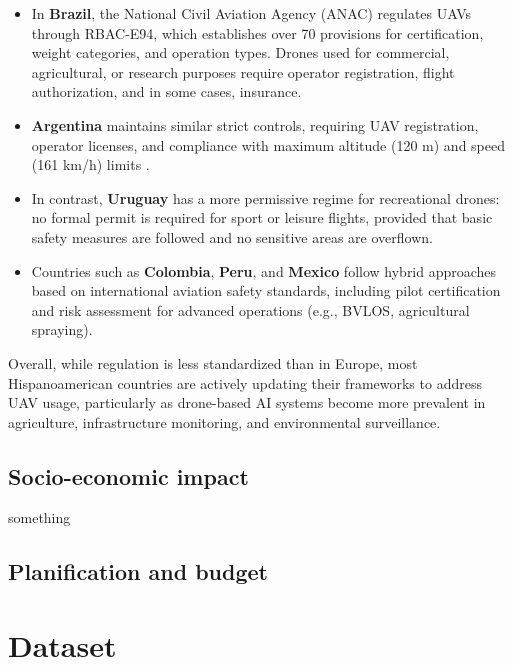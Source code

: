 \documentclass[12pt]{report} %
\begin{document}
\begin{itemize}
    \item In \textbf{Brazil}, the National Civil Aviation Agency (ANAC) regulates UAVs through RBAC-E94, which establishes over 70 provisions for certification, weight categories, and operation types. Drones used for commercial, agricultural, or research purposes require operator registration, flight authorization, and in some cases, insurance.

    \item \textbf{Argentina} maintains similar strict controls, requiring UAV registration, operator licenses, and compliance with maximum altitude (120 m) and speed (161 km/h) limits \cite{Sanchez23}.

    \item In contrast, \textbf{Uruguay} has a more permissive regime for recreational drones: no formal permit is required for sport or leisure flights, provided that basic safety measures are followed and no sensitive areas are overflown.

    \item Countries such as \textbf{Colombia}, \textbf{Peru}, and \textbf{Mexico} follow hybrid approaches based on international aviation safety standards, including pilot certification and risk assessment for advanced operations (e.g., BVLOS, agricultural spraying).
\end{itemize}

Overall, while regulation is less standardized than in Europe, most Hispanoamerican countries are actively updating their frameworks to address UAV usage, particularly as drone-based AI systems become more prevalent in agriculture, infrastructure monitoring, and environmental surveillance.

\section{Socio-economic impact}

something

\section{Planification and budget}

\clearpage

\chapter{Dataset}
\end{document}
